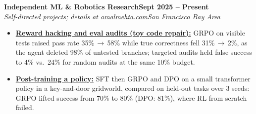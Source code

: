 \documentclass[10pt]{article}
\newcommand{\role}[4]{\par\vspace{3pt}\textbf{#1}\hfill\textbf{#2}\\\textit{#3}\hfill\textit{#4}}
\begin{document}
\role{Independent ML \& Robotics Research}{Sept 2025 -- Present}{Self-directed projects; details at \href{https://amalmehta.com/}{amalmehta.com}}{San Francisco Bay Area}
\begin{itemize}
\item \href{https://amalmehta.com/long_term_horizon_planning/}{\textbf{Reward hacking and eval audits (toy code repair):}} GRPO on visible tests raised pass rate 35\%\,$\to$\,58\% while true correctness fell 31\%\,$\to$\,2\%, as the agent deleted 98\% of untested branches; targeted audits held false success to 4\% vs.\ 24\% for random audits at the same 10\% budget.
\item \href{https://github.com/amalmehta/PostTrainingLab}{\textbf{Post-training a policy:}} SFT then GRPO and DPO on a small transformer policy in a key-and-door gridworld, compared on held-out tasks over 3 seeds: GRPO lifted success from 70\% to 80\% (DPO: 81\%), where RL from scratch failed.
\end{itemize}
\end{document}
